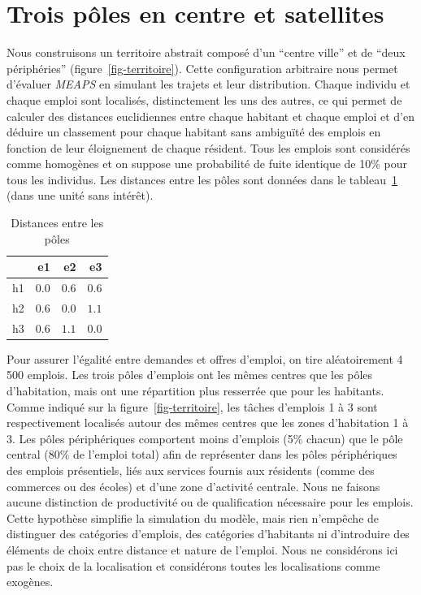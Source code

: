 \documentclass[
  10pt,
  a4paper,
  numbers=noendperiod,
  DIV=9]{scrreprt}
\begin{document}
\hypertarget{sec-3p2s}{%
\section{Trois pôles en centre et satellites}\label{sec-3p2s}}

Nous construisons un territoire abstrait composé d'un ``centre ville''
et de ``deux périphéries'' (figure~\ref{fig-territoire}). Cette
configuration arbitraire nous permet d'évaluer \emph{MEAPS} en simulant
les trajets et leur distribution. Chaque individu et chaque emploi sont
localisés, distinctement les uns des autres, ce qui permet de calculer
des distances euclidiennes entre chaque habitant et chaque emploi et
d'en déduire un classement pour chaque habitant sans ambiguïté des
emplois en fonction de leur éloignement de chaque résident. Tous les
emplois sont considérés comme homogènes et on suppose une probabilité de
fuite identique de 10\% pour tous les individus. Les distances entre les
pôles sont données dans le tableau~\ref{tbl-distances} (dans une unité
sans intérêt).

\hypertarget{tbl-distances}{}
\begin{longtable}{lrrr}
\caption{\label{tbl-distances}Distances entre les pôles }\tabularnewline

\toprule
 & e1 & e2 & e3 \\ 
\midrule
h1 & $0.0$ & $0.6$ & $0.6$ \\ 
h2 & $0.6$ & $0.0$ & $1.1$ \\ 
h3 & $0.6$ & $1.1$ & $0.0$ \\ 
\bottomrule
\end{longtable}

Pour assurer l'égalité entre demandes et offres d'emploi, on tire
aléatoirement 4 500 emplois. Les trois pôles d'emplois ont les mêmes
centres que les pôles d'habitation, mais ont une répartition plus
resserrée que pour les habitants. Comme indiqué sur la
figure~\ref{fig-territoire}, les tâches d'emplois 1 à 3 sont
respectivement localisés autour des mêmes centres que les zones
d'habitation 1 à 3. Les pôles périphériques comportent moins d'emplois
(5\% chacun) que le pôle central (80\% de l'emploi total) afin de
représenter dans les pôles périphériques des emplois présentiels, liés
aux services fournis aux résidents (comme des commerces ou des écoles)
et d'une zone d'activité centrale. Nous ne faisons aucune distinction de
productivité ou de qualification nécessaire pour les emplois. Cette
hypothèse simplifie la simulation du modèle, mais rien n'empêche de
distinguer des catégories d'emplois, des catégories d'habitants ni
d'introduire des éléments de choix entre distance et nature de l'emploi.
Nous ne considérons ici pas le choix de la localisation et considérons
toutes les localisations comme exogènes.
\end{document}
